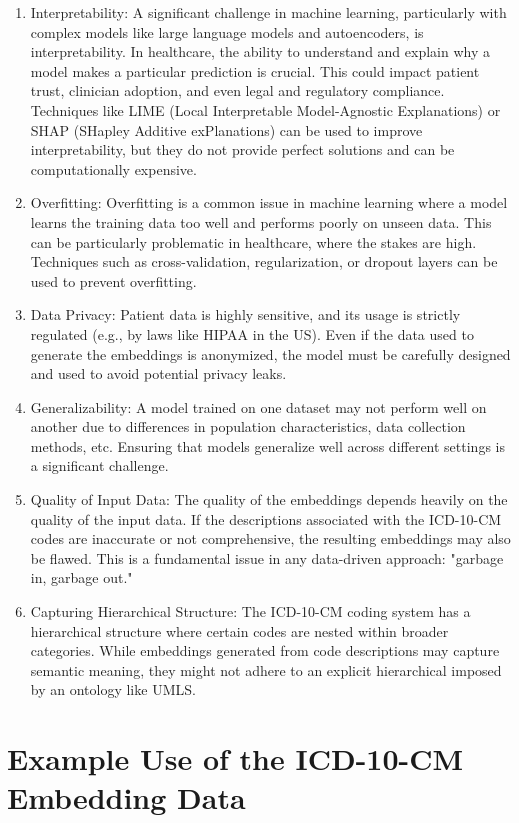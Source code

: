 \documentclass{bmcart}
\begin{document}
\begin{enumerate}
\item Interpretability: A significant challenge in machine learning, particularly with complex models like large language models and autoencoders, is interpretability. In healthcare, the ability to understand and explain why a model makes a particular prediction is crucial. This could impact patient trust, clinician adoption, and even legal and regulatory compliance. Techniques like LIME (Local Interpretable Model-Agnostic Explanations) or SHAP (SHapley Additive exPlanations) can be used to improve interpretability, but they do not provide perfect solutions and can be computationally expensive.
\item Overfitting: Overfitting is a common issue in machine learning where a model learns the training data too well and performs poorly on unseen data. This can be particularly problematic in healthcare, where the stakes are high. Techniques such as cross-validation, regularization, or dropout layers can be used to prevent overfitting.
\item Data Privacy: Patient data is highly sensitive, and its usage is strictly regulated (e.g., by laws like HIPAA in the US). Even if the data used to generate the embeddings is anonymized, the model must be carefully designed and used to avoid potential privacy leaks.
\item Generalizability: A model trained on one dataset may not perform well on another due to differences in population characteristics, data collection methods, etc. Ensuring that models generalize well across different settings is a significant challenge.
\item Quality of Input Data: The quality of the embeddings depends heavily on the quality of the input data. If the descriptions associated with the ICD-10-CM codes are inaccurate or not comprehensive, the resulting embeddings may also be flawed. This is a fundamental issue in any data-driven approach: "garbage in, garbage out."
\item Capturing Hierarchical Structure: The ICD-10-CM coding system has a hierarchical structure where certain codes are nested within broader categories. While embeddings generated from code descriptions may capture semantic meaning, they might not adhere to an explicit hierarchical imposed by an ontology like UMLS.
\end{enumerate}

\section{Example Use of the ICD-10-CM Embedding Data}
\end{document}
